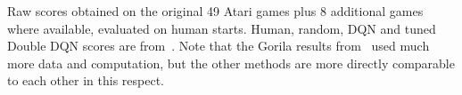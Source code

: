 \documentclass[a4paper]{article}
\begin{document}
\begin{table}[p]
{{%

} %
} %

\caption{
\label{tab-atari-raw-30human}
Raw scores obtained on the original 49 Atari games plus 8 additional games where available, evaluated on human starts.  Human, random, DQN and tuned Double DQN scores are from~\citet{double-dqn}.  Note that the Gorila results from~\citet{gorila} used much more data and computation, but the other methods are more directly comparable to each other in this respect.
}

\end{table}


\end{document}
